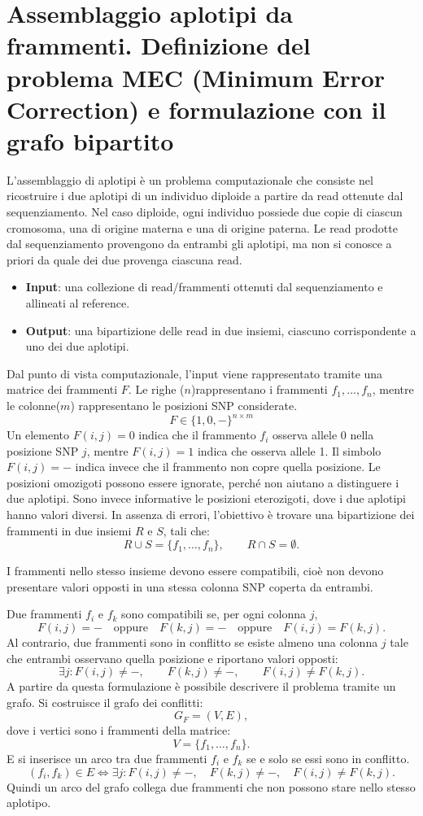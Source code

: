 \chapter{Assemblaggio aplotipi da frammenti. Definizione del problema MEC (Minimum Error
Correction) e formulazione con il grafo bipartito}

L'assemblaggio di aplotipi è un problema computazionale che consiste nel ricostruire i due aplotipi di un individuo diploide a partire da read ottenute dal sequenziamento.
Nel caso diploide, ogni individuo possiede due copie di ciascun cromosoma, una di origine materna e una di origine paterna. Le read prodotte dal sequenziamento provengono da entrambi gli aplotipi, ma non si conosce a priori da quale dei due provenga ciascuna read.
\begin{itemize}
    \item \textbf{Input}: una collezione di read/frammenti ottenuti dal sequenziamento e allineati al reference.
    \item \textbf{Output}: una bipartizione delle read in due insiemi, ciascuno corrispondente a uno dei due aplotipi.

\end{itemize}


Dal punto di vista computazionale, l'input viene rappresentato tramite una matrice dei frammenti \(F\). Le righe ($n$)rappresentano i frammenti \(f_1,\dots,f_n\), mentre le colonne($m$) rappresentano le posizioni SNP considerate.
\[
F \in \{1,0,-\}^{n \times m}
\]
Un elemento \(F(i,j)=0\) indica che il frammento \(f_i\) osserva allele 0 nella posizione SNP \(j\), mentre \(F(i,j)=1\) indica che osserva allele 1. Il simbolo \(F(i,j)=-\) indica invece che il frammento non copre quella posizione.
Le posizioni omozigoti possono essere ignorate, perché non aiutano a distinguere i due aplotipi. Sono invece informative le posizioni eterozigoti, dove i due aplotipi hanno valori diversi.
In assenza di errori, l'obiettivo è trovare una bipartizione dei frammenti in due insiemi \(R\) e \(S\), tali che:
\[
R \cup S = \{f_1,\dots,f_n\}, \qquad R \cap S = \emptyset.
\]

I frammenti nello stesso insieme devono essere compatibili, 
cioè non devono presentare valori opposti in una stessa colonna SNP coperta da entrambi.

Due frammenti \(f_i\) e \(f_k\) sono compatibili se, per ogni colonna \(j\),
\[
F(i,j)=- 
\quad \text{oppure} \quad 
F(k,j)=- 
\quad \text{oppure} \quad 
F(i,j)=F(k,j).
\]
Al contrario, due frammenti sono in conflitto se esiste almeno una colonna \(j\) tale che entrambi osservano quella 
posizione e riportano valori opposti:
\[
\exists j :
F(i,j)\neq -, \qquad
F(k,j)\neq -, \qquad
F(i,j)\neq F(k,j).
\]
A partire da questa formulazione è possibile descrivere il problema tramite un grafo. Si costruisce il grafo dei conflitti:
\[
G_F=(V,E),
\]
dove i vertici sono i frammenti della matrice:
\[
V=\{f_1,\dots,f_n\}.
\]
E si inserisce un arco tra due frammenti \(f_i\) e \(f_k\) se e solo se essi sono in conflitto. 
\[
(f_i,f_k)\in E
\iff
\exists j :
F(i,j)\neq -, \quad
F(k,j)\neq -, \quad
F(i,j)\neq F(k,j).
\] 
Quindi un arco del grafo collega due frammenti che non possono stare nello stesso aplotipo.

